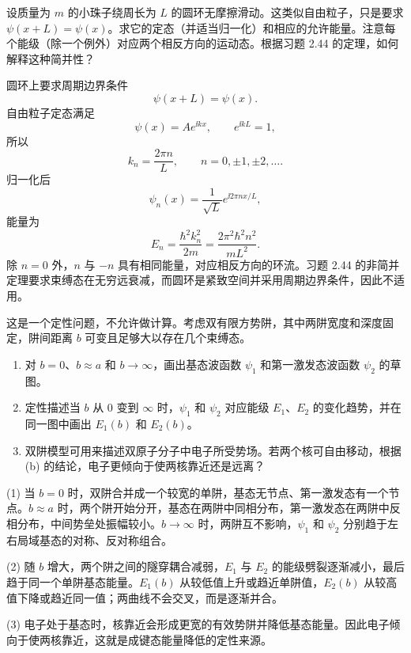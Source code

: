 \begin{question}
设质量为 $m$ 的小珠子绕周长为 $L$ 的圆环无摩擦滑动。这类似自由粒子，只是要求 $\psi(x+L)=\psi(x)$。求它的定态（并适当归一化）和相应的允许能量。注意每个能级（除一个例外）对应两个相反方向的运动态。根据习题 2.44 的定理，如何解释这种简并性？
\end{question}
\begin{solution}
圆环上要求周期边界条件
\[
\psi(x+L)=\psi(x).
\]
自由粒子定态满足
\[
\psi(x)=Ae^{\ii kx},
\qquad e^{\ii kL}=1,
\]
所以
\[
k_n=\frac{2\pi n}{L},
\qquad n=0,\pm1,\pm2,\ldots.
\]
归一化后
\[
\psi_n(x)=\frac1{\sqrt L}e^{\ii2\pi nx/L},
\]
能量为
\[
E_n=\frac{\hbar^2k_n^2}{2m}
=\frac{2\pi^2\hbar^2n^2}{mL^2}.
\]
除 $n=0$ 外，$n$ 与 $-n$ 具有相同能量，对应相反方向的环流。习题 2.44 的非简并定理要求束缚态在无穷远衰减，而圆环是紧致空间并采用周期边界条件，因此不适用。
\end{solution}

\begin{question}
这是一个定性问题，不允许做计算。考虑双有限方势阱，其中两阱宽度和深度固定，阱间距离 $b$ 可变且足够大以存在几个束缚态。
\begin{enumerate}
\item 对 $b=0$、$b\approx a$ 和 $b\to\infty$，画出基态波函数 $\psi_1$ 和第一激发态波函数 $\psi_2$ 的草图。
\item 定性描述当 $b$ 从 $0$ 变到 $\infty$ 时，$\psi_1$ 和 $\psi_2$ 对应能级 $E_1$、$E_2$ 的变化趋势，并在同一图中画出 $E_1(b)$ 和 $E_2(b)$。
\item 双阱模型可用来描述双原子分子中电子所受势场。若两个核可自由移动，根据 (b) 的结论，电子更倾向于使两核靠近还是远离？
\end{enumerate}
\end{question}
\begin{solution}
(1) 当 $b=0$ 时，双阱合并成一个较宽的单阱，基态无节点、第一激发态有一个节点。$b\approx a$ 时，两个阱开始分开，基态在两阱中同相分布，第一激发态在两阱中反相分布，中间势垒处振幅较小。$b\to\infty$ 时，两阱互不影响，$\psi_1$ 和 $\psi_2$ 分别趋于左右局域基态的对称、反对称组合。

(2) 随 $b$ 增大，两个阱之间的隧穿耦合减弱，$E_1$ 与 $E_2$ 的能级劈裂逐渐减小，最后趋于同一个单阱基态能量。$E_1(b)$ 从较低值上升或趋近单阱值，$E_2(b)$ 从较高值下降或趋近同一值；两曲线不会交叉，而是逐渐并合。

(3) 电子处于基态时，核靠近会形成更宽的有效势阱并降低基态能量。因此电子倾向于使两核靠近，这就是成键态能量降低的定性来源。
\end{solution}

